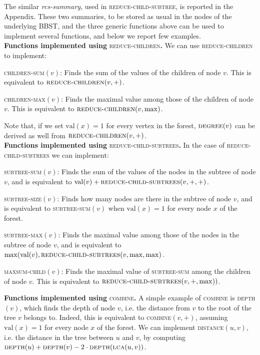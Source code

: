 \documentclass[a4paper,USenglish]{lipics}
\begin{document}
The similar \emph{rcs-summary}, used in \textsc{reduce-child-subtree}, is reported in the Appendix. These two summaries, to be stored as usual in the nodes of the underlying BBST, and the three generic functions above can be used to implement several functions, and below we report few examples.
\\[4mm]
\noindent\textbf{\textsf{Functions implemented using}} \textsc{reduce-children}\textbf{.}\quad
We can use \textsc{reduce-children} to implement:
		\begin{compactitem}
			\item \textsc{children-sum}$(v)$: Finds the sum of the values of the children of node $v$. This is equivalent to $\textsc{reduce-children}(v, +)$.
		 	\item \textsc{children-max}$(v)$: Finds the maximal value among those of the children of node $v$. This is equivalent to $\textsc{reduce-children}(v, \max)$.
		\end{compactitem}
Note that, if we set $\textrm{val}(x) = 1$ for every vertex in the forest,  $\textsc{degree}(v)$ can be derived as well from $\textsc{reduce-children}(v, +)$.
\\[4mm]
\noindent\textbf{\textsf{Functions implemented using}} \textsc{reduce-child-subtrees}\textbf{.}\quad
In the case of \textsc{reduce-child-subtrees} we can implement:
		\begin{compactitem}
			\item \textsc{subtree-sum}$(v)$: Finds the sum of the values of the nodes in the subtree of node $v$, and is equivalent to $\textrm{val}(v) + \textsc{reduce-child-subtrees}(v,+,+)$.
			\item \textsc{subtree-size}$(v)$: Finds how many nodes are there in the subtree of node $v$, and is equivalent to \textsc{subtree-sum}$(v)$ when $\textrm{val}(x) = 1$ for every node $x$ of the forest.
		 	\item \textsc{subtree-max}$(v)$: Finds the maximal value among those of the nodes in the subtree of node $v$, and is equivalent to $\max(\textrm{val}(v),\textsc{reduce-child-subtrees}(v, \max, \max)$.
			\item \textsc{maxsum-child}$(v)$: Finds the maximal value of \textsc{subtree-sum} among the children of node $v$. This is equivalent to $\textsc{reduce-child-subtrees}(v, +, \max))$. 	
		\end{compactitem}
\vspace{4mm}
\noindent\textbf{\textsf{Functions implemented using}} \textsc{combine}\textbf{.}\quad 		
		A simple example of \textsc{combine} is \textsc{depth}$(v)$, which finds the depth of node $v$, i.e. the distance from $v$ to the root of the tree $v$ belongs to. Indeed, this is equivalent to \textsc{combine}$(v, +)$, assuming $\textrm{val}(x) = 1$ for every node $x$ of the forest. We can implement \textsc{distance}$(u,v)$, i.e. the distance in the tree between $u$ and $v$, by computing $\text{\textsc{depth}}(u)+\textsc{depth}(v)-2\cdot\textsc{depth}(\textsc{lca}(u,v))$.
\end{document}
